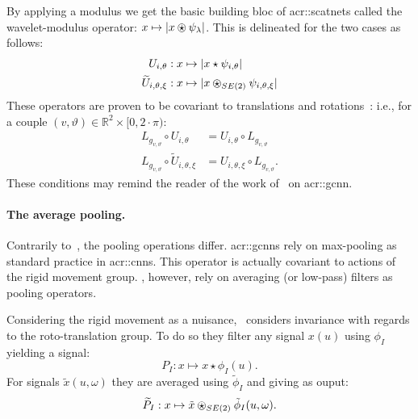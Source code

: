                By applying a modulus we get the basic building bloc of \glspl{acr::scatnet} called the wavelet-modulus operator: $x \mapsto \vert x\ostar\psi_{\lambda} \vert$.
                This is delineated for the two cases as follows:
                \begin{align}
                    \label{eq::wavelet-modulus_1_2}
                    U_{i, \theta}: x &\mapsto \vert x\star\psi_{i, \theta}\vert\\
                    \widetilde{U}_{i, \theta, \xi}: x &\mapsto \vert x\ostar_{SE(2)}\psi_{i, \theta, \xi} \vert
                \end{align}
                These operators are proven to be covariant to translations and rotations~\parencite{mallat2012group,sifre2013rotation}: i.e., for a couple $(v, \vartheta) \in \mathbb{R}^2 \times [0, 2\cdot\pi)$:
                \begin{align}
                    \label{eq::covariance_wavelet-modulus}
                    L_{g_{v, \vartheta}} \circ U_{i, \theta} &= U_{i, \theta} \circ L_{g_{v, \vartheta}}\\
                    L_{g_{v, \vartheta}} \circ \widetilde{U}_{i, \theta, \xi} &= U_{i, \theta, \xi} \circ L_{g_{v, \vartheta}}.
                \end{align}
                These conditions may remind the reader of the work of~\textcite{cohen2016group} on \gls{acr::gcnn}.
            
            \paragraph{The average pooling.}
                Contrarily to~\parencite{cohen2016group}, the pooling operations differ.
                \glspl{acr::gcnn} rely on max-pooling as standard practice in \glspl{acr::cnn}.
                This operator is actually covariant to actions of the rigid movement group.
                \parencite{bruna2013invariant, sifre2013rotation,oyallon2015deep}, however, rely on averaging (or low-pass) filters as pooling operators.

                Considering the rigid movement as a nuisance,~\parencite{sifre2013rotation} considers invariance with regards to the roto-translation group.
                To do so they filter any signal $x(u)$ using $\phi_I$ yielding a signal:
                \begin{equation}
                    \label{eq::pool_bi-dim}
                    P_I: x \mapsto x \star \phi_I (u).
                \end{equation}
                For signals $\tilde{x}(u, \omega)$ they are averaged using $\tilde{\phi}_I$ and giving as ouput:
                \begin{equation}
                    \label{eq::pool_bi-dim-angular}
                    \widetilde{P}_I: x \mapsto \tilde{x} \ostar_{SE(2)} \tilde{\phi}_I (u, \omega).
                \end{equation}

